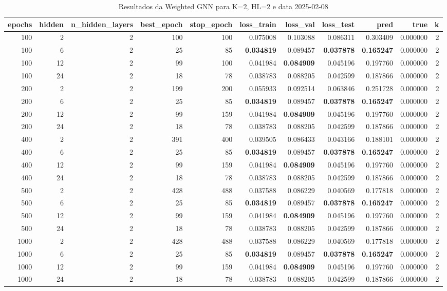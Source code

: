 \begin{table}
\caption{Resultados da Weighted GNN para K=2, HL=2 e data 2025-02-08}
\label{tab:weighted_gnn_results_k2_hl2_d20250208}
\begin{tabular}{rrrrrrrrrrr}
\toprule
epochs & hidden & n\_hidden\_layers & best\_epoch & stop\_epoch & loss\_train & loss\_val & loss\_test & pred & true & k \\
\midrule
100 & 2 & 2 & 100 & 100 & 0.075008 & 0.103088 & 0.086311 & 0.303409 & 0.000000 & 2 \\
100 & 6 & 2 & 25 & 85 & \textbf{0.034819} & 0.089457 & \textbf{0.037878} & \textbf{0.165247} & 0.000000 & 2 \\
100 & 12 & 2 & 99 & 100 & 0.041984 & \textbf{0.084909} & 0.045196 & 0.197760 & 0.000000 & 2 \\
100 & 24 & 2 & 18 & 78 & 0.038783 & 0.088205 & 0.042599 & 0.187866 & 0.000000 & 2 \\
200 & 2 & 2 & 199 & 200 & 0.055933 & 0.092514 & 0.063846 & 0.251728 & 0.000000 & 2 \\
200 & 6 & 2 & 25 & 85 & \textbf{0.034819} & 0.089457 & \textbf{0.037878} & \textbf{0.165247} & 0.000000 & 2 \\
200 & 12 & 2 & 99 & 159 & 0.041984 & \textbf{0.084909} & 0.045196 & 0.197760 & 0.000000 & 2 \\
200 & 24 & 2 & 18 & 78 & 0.038783 & 0.088205 & 0.042599 & 0.187866 & 0.000000 & 2 \\
400 & 2 & 2 & 391 & 400 & 0.039505 & 0.086433 & 0.043166 & 0.188101 & 0.000000 & 2 \\
400 & 6 & 2 & 25 & 85 & \textbf{0.034819} & 0.089457 & \textbf{0.037878} & \textbf{0.165247} & 0.000000 & 2 \\
400 & 12 & 2 & 99 & 159 & 0.041984 & \textbf{0.084909} & 0.045196 & 0.197760 & 0.000000 & 2 \\
400 & 24 & 2 & 18 & 78 & 0.038783 & 0.088205 & 0.042599 & 0.187866 & 0.000000 & 2 \\
500 & 2 & 2 & 428 & 488 & 0.037588 & 0.086229 & 0.040569 & 0.177818 & 0.000000 & 2 \\
500 & 6 & 2 & 25 & 85 & \textbf{0.034819} & 0.089457 & \textbf{0.037878} & \textbf{0.165247} & 0.000000 & 2 \\
500 & 12 & 2 & 99 & 159 & 0.041984 & \textbf{0.084909} & 0.045196 & 0.197760 & 0.000000 & 2 \\
500 & 24 & 2 & 18 & 78 & 0.038783 & 0.088205 & 0.042599 & 0.187866 & 0.000000 & 2 \\
1000 & 2 & 2 & 428 & 488 & 0.037588 & 0.086229 & 0.040569 & 0.177818 & 0.000000 & 2 \\
1000 & 6 & 2 & 25 & 85 & \textbf{0.034819} & 0.089457 & \textbf{0.037878} & \textbf{0.165247} & 0.000000 & 2 \\
1000 & 12 & 2 & 99 & 159 & 0.041984 & \textbf{0.084909} & 0.045196 & 0.197760 & 0.000000 & 2 \\
1000 & 24 & 2 & 18 & 78 & 0.038783 & 0.088205 & 0.042599 & 0.187866 & 0.000000 & 2 \\
\bottomrule
\end{tabular}
\end{table}

